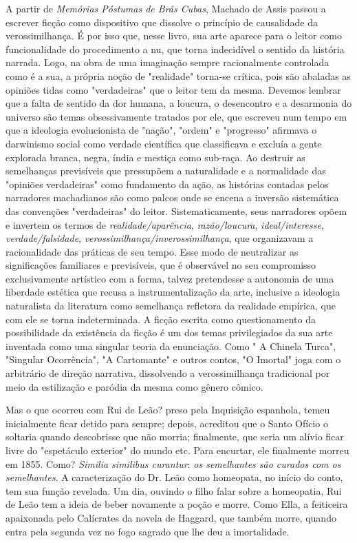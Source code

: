 A partir de \emph{Memórias Póstumas de Brás Cubas}, Machado de Assis
passou a escrever ficção como dispositivo que dissolve o princípio de
causalidade da verossimilhança. É por isso que, nesse livro, sua arte
aparece para o leitor como funcionalidade do procedimento a nu, que
torna indecidível o sentido da história narrada. Logo, na obra de uma
imaginação sempre racionalmente controlada como é a sua, a própria noção
de "realidade" torna-se crítica, pois são abaladas as opiniões tidas
como "verdadeiras" que o leitor tem da mesma. Devemos lembrar que a
falta de sentido da dor humana, a loucura, o desencontro e a desarmonia
do universo são temas obsessivamente tratados por ele, que escreveu num
tempo em que a ideologia evolucionista de "nação", "ordem" e "progresso"
afirmava o darwinismo social como verdade científica que classificava e
excluía a gente explorada branca, negra, índia e mestiça como sub-raça.
Ao destruir as semelhanças previsíveis que pressupõem a naturalidade e a
normalidade das "opiniões verdadeiras" como fundamento da ação, as
histórias contadas pelos narradores machadianos são como palcos onde se
encena a inversão sistemática das convenções "verdadeiras" do leitor.
Sistematicamente, seus narradores opõem e invertem os termos de
\emph{realidade/aparência}, \emph{razão/loucura},
\emph{ideal/interesse}, \emph{verdade/falsidade},
\emph{verossimilhança/inverossimilhança}, que organizavam a
racionalidade das práticas de seu tempo. Esse modo de neutralizar as
significações familiares e previsíveis, que é observável no seu
compromisso exclusivamente artístico com a forma, talvez pretendesse a
autonomia de uma liberdade estética que recusa a instrumentalização da
arte, inclusive a ideologia naturalista da literatura como semelhança
refletora da realidade empírica, que com ele se torna indeterminada. A
ficção escrita como questionamento da possibilidade da existência da
ficção é um dos temas privilegiados da sua arte inventada como uma
singular teoria da enunciação. Como " A Chinela Turca", "Singular
Ocorrência", "A Cartomante" e outros contos, "O Imortal" joga com o
arbitrário de direção narrativa, dissolvendo a verossimilhança
tradicional por meio da estilização e paródia da mesma como gênero
cômico.

Mas o que ocorreu com Rui de Leão? preso pela Inquisição espanhola,
temeu inicialmente ficar detido para sempre; depois, acreditou que o
Santo Ofício o soltaria quando descobrisse que não morria; finalmente,
que seria um alívio ficar livre do "espetáculo exterior" do mundo etc.
Para encurtar, ele finalmente morreu em 1855. Como? \emph{Similia
similibus curantur}: \emph{os semelhantes são curados com os
semelhantes}. A caracterização do Dr. Leão como homeopata, no início do
conto, tem sua função revelada. Um dia, ouvindo o filho falar sobre a
homeopatia, Rui de Leão tem a ideia de beber novamente a poção e morre.
Como Ella, a feiticeira apaixonada pelo Calícrates da novela de Haggard,
que também morre, quando entra pela segunda vez no fogo sagrado que lhe
deu a imortalidade.

